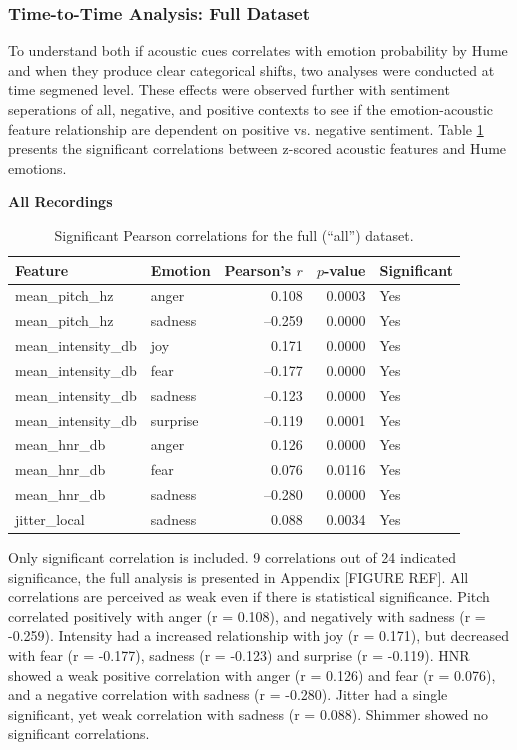 \subsubsection{Time-to-Time Analysis: Full Dataset}
To understand both if acoustic cues correlates with emotion probability by Hume and when they produce clear categorical shifts, two analyses were conducted at time segmened level. 
These effects were observed further with sentiment seperations of all, negative, and positive contexts to see if the emotion-acoustic feature relationship are dependent on positive vs. negative sentiment. 
Table \ref{tab:rq1_time_all_correlations} presents the significant correlations between z-scored acoustic features and Hume emotions.
\begin{table}[H]
    \centering
    \caption*{\textbf{All Recordings}}
    \begin{tabular}{l l r r l}
      \toprule
      \textbf{Feature} & \textbf{Emotion} & \textbf{Pearson’s \(r\)} & \textbf{\(p\)-value} & \textbf{Significant} \\
      \midrule
      mean\_pitch\_hz       & anger      &  0.108  & 0.0003 & Yes \\
      mean\_pitch\_hz       & sadness    & –0.259  & 0.0000 & Yes \\
      mean\_intensity\_db   & joy        &  0.171  & 0.0000 & Yes \\
      mean\_intensity\_db   & fear       & –0.177  & 0.0000 & Yes \\
      mean\_intensity\_db   & sadness    & –0.123  & 0.0000 & Yes \\
      mean\_intensity\_db   & surprise   & –0.119  & 0.0001 & Yes \\
      mean\_hnr\_db         & anger      &  0.126  & 0.0000 & Yes \\
      mean\_hnr\_db         & fear       &  0.076  & 0.0116 & Yes \\
      mean\_hnr\_db         & sadness    & –0.280  & 0.0000 & Yes \\
      jitter\_local         & sadness    &  0.088  & 0.0034 & Yes \\
      \bottomrule
    \end{tabular}
    \caption{Significant Pearson correlations for the full (“all”) dataset.}
    \label{tab:rq1_time_all_correlations}
  \end{table}
 
  Only significant correlation is included. 9 correlations out of 24 indicated significance, the full analysis is presented in Appendix [FIGURE REF]. 
  All correlations are perceived as weak even if there is statistical significance. Pitch correlated positively with anger (r = 0.108), and negatively with sadness (r = -0.259). 
  Intensity had a increased relationship with joy (r = 0.171), but decreased with fear (r = -0.177), sadness (r = -0.123) and surprise (r = -0.119). HNR showed a weak positive correlation with anger (r = 0.126) and fear (r = 0.076), and a negative correlation with sadness (r = -0.280). 
  Jitter had a single significant, yet weak correlation with sadness (r = 0.088). Shimmer showed no significant correlations. 

